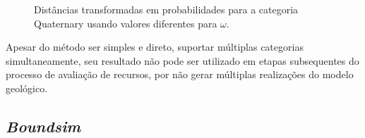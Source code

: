 \begin{figure}[H] 
    \centering
    \caption{Distâncias transformadas em probabilidades para a categoria Quaternary usando valores diferentes para $\omega$.} \label{jura_prob}
     \hspace{1em}
     \hspace{1em}
\end{figure}

Apesar do método ser simples e direto, suportar múltiplas categorias simultaneamente, seu resultado não pode ser utilizado em etapas subsequentes do processo de  avaliação de recursos, por não gerar múltiplas realizações do modelo geológico.

\subsection{\textit{Boundsim}}

